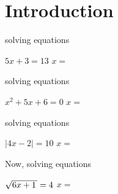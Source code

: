\section{Introduction}

\begin{tcbraster}[
    raster equal height, 
    raster columns = 2,
    raster column skip = 0.5in,
]
    \begin{tcolorbox}[colback=white,boxrule=0.5pt,]
        \raggedright
        {\small solving  equations \phantom{xxxxxxx}}
        \begin{center}
            \small
            $5x +3 = 13$
            \quad{\large$\Rightarrow$}\quad
            $x =$ 
        \end{center}
    \end{tcolorbox}
    \begin{tcolorbox}[colback=white,boxrule=0.5pt,]
        \raggedright
        {\small solving  equations}
        \begin{center}
            \small
            $x^2 + 5x + 6 = 0$
            \quad{\large$\Rightarrow$}\quad
            $x =$ 
        \end{center}
    \end{tcolorbox}
    \begin{tcolorbox}[colback=white,boxrule=0.5pt,]
        \raggedright
        {\small solving  equations}
        \begin{center}
            \small
            $|4x -2 | = 10$
            \quad{\large$\Rightarrow$}\quad
            $x =$ 
        \end{center}
    \end{tcolorbox}
    \begin{tcolorbox}[colback=white,boxrule=0.5pt,]
        \raggedright
        {\small Now, solving  equations}
        \begin{center}
            \small
            $\myRoot{6x+1} = 4$
            \quad{\large$\Rightarrow$}\quad
            $x =$ 
        \end{center}
    \end{tcolorbox}
\end{tcbraster}

